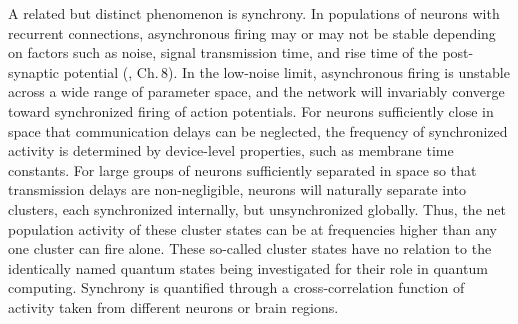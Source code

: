 A related but distinct phenomenon is synchrony. In populations of neurons with recurrent connections, asynchronous firing may or may not be stable depending on factors such as noise, signal transmission time, and rise time of the post-synaptic potential (\cite{geki2002}, Ch.\,8). In the low-noise limit, asynchronous firing is unstable across a wide range of parameter space, and the network will invariably converge toward synchronized firing of action potentials. For neurons sufficiently close in space that communication delays can be neglected, the frequency of synchronized activity is determined by device-level properties, such as membrane time constants. For large groups of neurons sufficiently separated in space so that transmission delays are non-negligible, neurons will naturally separate into clusters, each synchronized internally, but unsynchronized globally. Thus, the net population activity of these cluster states can be at frequencies higher than any one cluster can fire alone. These so-called cluster states have no relation to the identically named quantum states being investigated for their role in quantum computing. Synchrony is quantified through a cross-correlation function of activity taken from different neurons or brain regions.

